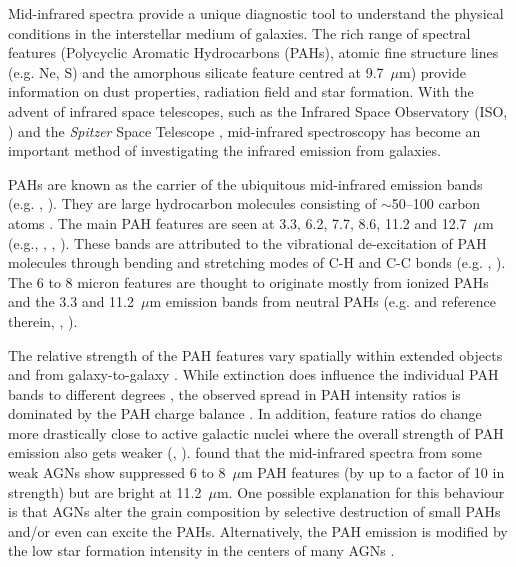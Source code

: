 Mid-infrared spectra provide a unique diagnostic tool to understand the physical conditions in the interstellar medium of galaxies. 
The rich range of spectral features (Polycyclic Aromatic Hydrocarbons (PAHs), atomic fine structure lines (e.g. Ne, S) and the
amorphous silicate feature centred at 9.7~$\mu$m) provide information on dust properties, radiation field and star formation. 
With the advent of infrared space telescopes, such as the Infrared Space Observatory (ISO, \citealt{Kessler1996}) and 
the {\em Spitzer} Space Telescope \citep{spitzer2004},  mid-infrared spectroscopy has become an important method
of investigating the infrared emission from galaxies. 

PAHs are known as the carrier of the ubiquitous mid-infrared emission bands (e.g. \citealt{Allamandola1989}, \citealt{puget89}).
They are large hydrocarbon molecules consisting of $\sim$50--100 carbon atoms \citep{Tielens2008}. 
The main PAH features are seen at 3.3, 6.2, 7.7, 8.6, 11.2 and 12.7~$\mu $m (e.g., \citealt{Gillett:73}, \citealt{Geballe:85}, \citealt{Peeters:toledo:11}). 
These bands are attributed to the vibrational de-excitation of PAH molecules through bending and stretching modes of C-H and C-C bonds (e.g. \citealt{Allamandola1989}, \citealt{puget89}). 
The 6 to 8 micron features are thought to originate mostly from ionized PAHs and the 3.3 and 11.2~$\mu$m 
emission bands from neutral PAHs (e.g. \citealt{Hudgins:rev:04} and reference therein, \citealt{Hony:oops:01},  \citealt{Galliano2008}). 

The relative strength of the PAH features vary spatially within extended objects and from galaxy-to-galaxy \citep[e.g.][]{Galliano2008}. While extinction does influence the individual PAH bands to different degrees \citep[e.g.][]{Brandl2006, Stock:13}, the observed spread in PAH intensity ratios is dominated by the PAH charge balance \citep[e.g.][]{Galliano2008}. In addition, feature ratios do change more drastically close to active galactic nuclei where the overall strength of PAH emission also gets weaker (\citealt{Roche1991}, \citealt{Smith:2007lr}). \citet{Smith:2007lr} found that the mid-infrared 
spectra from some weak AGNs show suppressed 6 to 8~$\mu$m PAH features (by up to a factor of 10 in strength) but are bright at 11.2~$\mu$m. One possible explanation for this behaviour is that AGNs alter the grain composition by selective destruction of small PAHs and/or even can excite the PAHs. Alternatively, the PAH emission is modified by the low star formation intensity in the centers of many AGNs \citep{Smith:2007lr}. 

